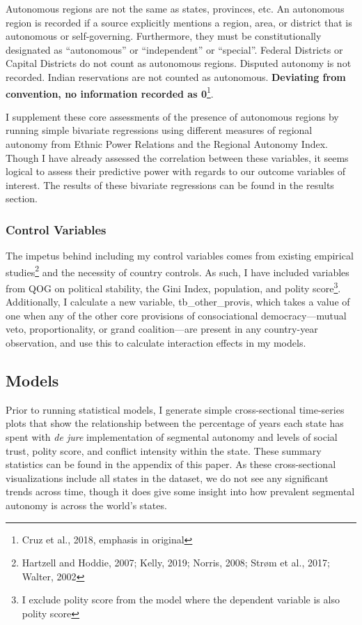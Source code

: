 \documentclass[12pt]{article}
\begin{document}
\singlespacing
Autonomous regions are not the same as states, provinces, etc. An autonomous region is recorded if a source explicitly mentions a region, area, or district that is autonomous or self-governing. Furthermore, they must be constitutionally designated as “autonomous” or “independent” or “special”. Federal Districts or Capital
Districts do not count as autonomous regions. Disputed autonomy is not recorded. Indian reservations are
not counted as autonomous. \textbf{Deviating from convention, no information recorded as 0}\footnote{Cruz et al., 2018, emphasis in original}.

\doublespacing
I supplement these core assessments of the presence of autonomous regions by running simple bivariate regressions using different measures of regional autonomy from Ethnic Power Relations and the Regional Autonomy Index. Though I have already assessed the correlation between these variables, it seems logical to assess their predictive power with regards to our outcome variables of interest. The results of these bivariate regressions can be found in the results section. 

\subsubsection{Control Variables} 
The impetus behind including my control variables comes from existing empirical studies\footnote{Hartzell and Hoddie, 2007; Kelly, 2019; Norris, 2008; Strøm et al., 2017; Walter, 2002} and the necessity of country controls. As such, I have included variables from QOG on political stability, the Gini Index, population, and polity score\footnote{I exclude polity score from the model where the dependent variable is also polity score}. Additionally, I calculate a new variable, tb\_other\_provis, which takes a value of one when any of the other core provisions of consociational democracy---mutual veto, proportionality, or grand coalition---are present in any country-year observation, and use this to calculate interaction effects in my models. 

\subsection{Models}
Prior to running statistical models, I generate simple cross-sectional time-series plots that show the relationship between the percentage of years each state has spent with \textit{de jure} implementation of segmental autonomy and levels of social trust, polity score, and conflict intensity within the state. These summary statistics can be found in the appendix of this paper. As these cross-sectional visualizations include all states in the dataset, we do not see any significant trends across time, though it does give some insight into how prevalent segmental autonomy is across the world's states. 
\end{document}
